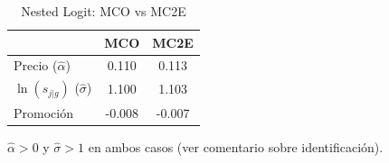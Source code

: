 \begin{table}[H]
\centering
\caption{Nested Logit: MCO vs MC2E}
\begin{tabular}{lcc}
\toprule
& MCO & MC2E \\
\midrule
Precio ($\hat{\alpha}$) & 0.110 & 0.113 \\
$\ln(s_{j|g})$ ($\hat{\sigma}$) & 1.100 & 1.103 \\
Promoci\'on & -0.008 & -0.007 \\
\bottomrule
\end{tabular}

\smallskip
{\footnotesize\begin{minipage}{0.92\linewidth}$\hat{\alpha}>0$ y $\hat{\sigma}>1$ en ambos casos (ver comentario sobre identificaci\'on).\end{minipage}}
\end{table}

